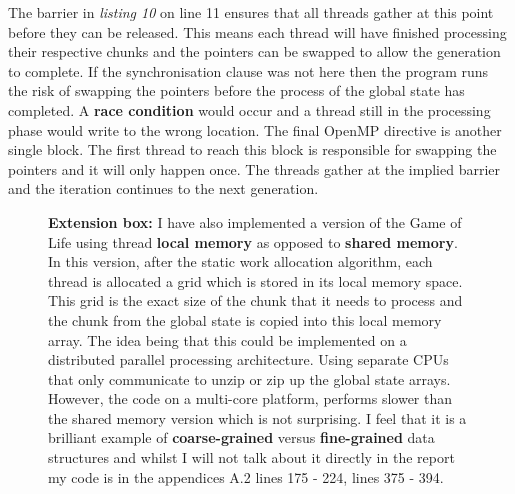 \documentclass[11pt]{article} %
\begin{document}
The barrier in {\it listing 10} on line 11 ensures that all threads gather at this point before they can be released. This means each thread will have finished processing their respective chunks and the pointers can be swapped to allow the generation to complete. If the synchronisation clause was not here then the program runs the risk of swapping the pointers before the process of the global state has completed. A {\bf race condition} would occur and a thread still in the processing phase would write to the wrong location. The final OpenMP directive is another single block. The first thread to reach this block is responsible for swapping the pointers and it will only happen once. The threads gather at the implied barrier and the iteration continues to the next generation.
\begin{figure}
\begin{mdframed}
{\bf Extension box: } I have also implemented a version of the Game of Life using thread {\bf local memory} as opposed to {\bf shared memory}. In this version, after the static work allocation algorithm, each thread is allocated a grid which is stored in its local memory space. This grid is the exact size of the chunk that it needs to process and the chunk from the global state is copied into this local memory array. The idea being that this could be implemented on a distributed parallel processing architecture. Using separate CPUs that only communicate to unzip or zip up the global state arrays. However, the code on a multi-core platform, performs slower than the shared memory version which is not surprising. I feel that it is a brilliant example of {\bf coarse-grained} versus {\bf fine-grained} data structures and whilst I will not talk about it directly in the report my code is in the appendices A.2 lines 175 - 224, lines 375 - 394.
\end{mdframed}
\end{figure}
\end{document}
